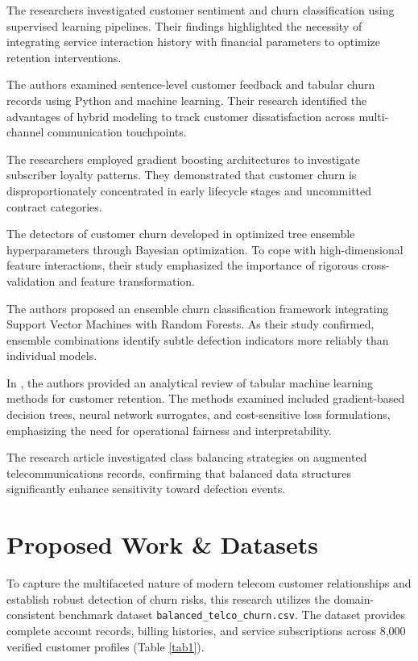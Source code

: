 \documentclass[conference]{IEEEtran}
\begin{document}
The researchers \cite{ref14} investigated customer sentiment and churn classification using supervised learning pipelines. Their findings highlighted the necessity of integrating service interaction history with financial parameters to optimize retention interventions.

The authors \cite{ref15} examined sentence-level customer feedback and tabular churn records using Python and machine learning. Their research identified the advantages of hybrid modeling to track customer dissatisfaction across multi-channel communication touchpoints.

The researchers \cite{ref16} employed gradient boosting architectures to investigate subscriber loyalty patterns. They demonstrated that customer churn is disproportionately concentrated in early lifecycle stages and uncommitted contract categories.

The detectors of customer churn developed in \cite{ref17} optimized tree ensemble hyperparameters through Bayesian optimization. To cope with high-dimensional feature interactions, their study emphasized the importance of rigorous cross-validation and feature transformation.

The authors \cite{ref18} proposed an ensemble churn classification framework integrating Support Vector Machines with Random Forests. As their study confirmed, ensemble combinations identify subtle defection indicators more reliably than individual models.

In \cite{ref19}, the authors provided an analytical review of tabular machine learning methods for customer retention. The methods examined included gradient-based decision trees, neural network surrogates, and cost-sensitive loss formulations, emphasizing the need for operational fairness and interpretability.

The research article \cite{ref20} investigated class balancing strategies on augmented telecommunications records, confirming that balanced data structures significantly enhance sensitivity toward defection events.

\section{Proposed Work \& Datasets}
To capture the multifaceted nature of modern telecom customer relationships and establish robust detection of churn risks, this research utilizes the domain-consistent benchmark dataset \texttt{balanced\_telco\_churn.csv}. The dataset provides complete account records, billing histories, and service subscriptions across 8,000 verified customer profiles (Table \ref{tab1}).
\end{document}
